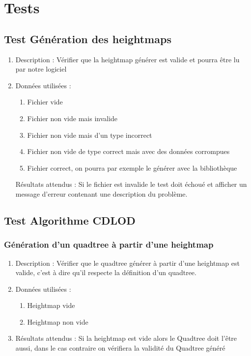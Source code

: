 \documentclass[12pt]{report}
\begin{document}
\newpage

\chapter{Tests}

\section{Test Génération des heightmaps}
\begin{enumerate}
    \item Description : Vérifier que la heightmap générer est valide et pourra être lu par notre logiciel
    \item Données utilisées : 
    \begin{enumerate}
        \item Fichier vide
        \item Fichier non vide mais invalide
        \item Fichier non vide mais d'un type incorrect
        \item Fichier non vide de type correct mais avec des données corrompues
        \item Fichier correct, on pourra par exemple le générer avec la bibliothèque \cite{libnoisewebsite}
    \end{enumerate}
    
    Résultats attendus : Si le fichier est invalide le test doit échoué et afficher un message d'erreur contenant une description du problème.
\end{enumerate}

\section{Test Algorithme CDLOD}
\subsection{Génération d'un quadtree à partir d'une heightmap}
\begin{enumerate}
    \item Description : Vérifier que le quadtree générer à partir d'une heightmap est valide, c'est à dire qu'il respecte la définition d'un quadtree.
    \item Données utilisées :
    \begin{enumerate}
        \item Heightmap vide
        \item Heightmap non vide
    \end{enumerate}
    \item Résultats attendus : Si la heightmap est vide alors le Quadtree doit l'être aussi, dans le cas contraire on vérifiera la validité du Quadtree généré
\end{enumerate}
\end{document}
